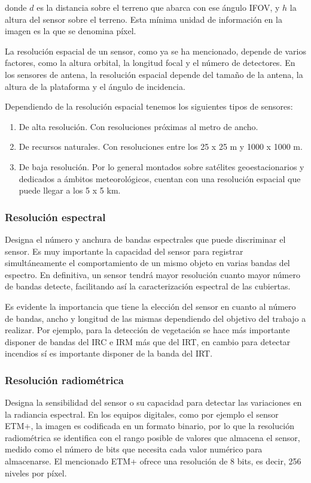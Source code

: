 \noindent donde $d$ es la distancia sobre el terreno que abarca con ese ángulo \ac{IFOV}, y $h$ la altura del sensor sobre el terreno. Esta mínima unidad de información en la imagen es la que se denomina píxel.%

La resolución espacial de un sensor, como ya se ha mencionado, depende de varios factores, como la altura orbital, la longitud focal y el número de detectores. En los sensores de antena, la resolución espacial depende del tamaño de la antena, la altura de la plataforma y el ángulo de incidencia.%

Dependiendo de la resolución espacial tenemos los siguientes tipos de sensores:
\begin{enumerate}
	\item De alta resolución. Con resoluciones próximas al metro de ancho.
	\item De recursos naturales. Con resoluciones entre los 25 x 25 m y 1000 x 1000 m.
	\item De baja resolución. Por lo general montados sobre satélites geoestacionarios y dedicados a ámbitos meteorológicos, cuentan con una resolución espacial que puede llegar a los 5 x 5 km.
\end{enumerate}

\subsubsection{Resolución espectral}
Designa el número y anchura de bandas espectrales que puede discriminar el sensor. Es muy importante la capacidad del sensor para registrar simultáneamente el comportamiento de un mismo objeto en varias bandas del espectro. En definitiva, un sensor tendrá mayor resolución cuanto mayor número de bandas detecte, facilitando así la caracterización espectral de las cubiertas.%

Es evidente la importancia que tiene la elección del sensor en cuanto al número de bandas, ancho y longitud de las mismas dependiendo del objetivo del trabajo a realizar. Por ejemplo, para la detección de vegetación se hace más importante disponer de bandas del \ac{IRC} e \ac{IRM} más que del \ac{IRT}, en cambio para detectar incendios sí es importante disponer de la banda del \ac{IRT}.

\subsubsection{Resolución radiométrica}
Designa la sensibilidad del sensor o su capacidad para detectar las variaciones en la radiancia espectral. En los equipos digitales, como por ejemplo el sensor \ac{ETM+}, la imagen es codificada en un formato binario, por lo que la resolución radiométrica se identifica con el rango posible de valores que almacena el sensor, medido como el número de bits que necesita cada valor numérico para almacenarse. El mencionado \ac{ETM+} ofrece una resolución de 8 bits, es decir, 256 niveles por píxel.%

